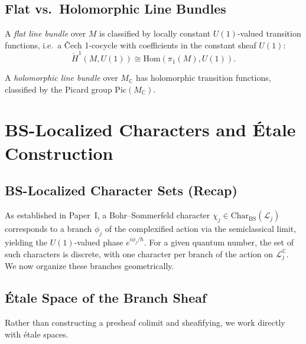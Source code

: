 \documentclass[11pt]{article}
\begin{document}
\subsection{Flat vs.\ Holomorphic Line Bundles}

A \emph{flat line bundle} over $M$ is classified by locally constant
$U(1)$-valued transition functions, i.e.\ a \v{C}ech 1-cocycle with
coefficients in the constant sheaf $U(1)$:
\[
  \check{H}^1(M, U(1)) \cong \mathrm{Hom}(\pi_1(M), U(1)).
\]

A \emph{holomorphic line bundle} over $M_\mathbb{C}$ has holomorphic
transition functions, classified by the Picard group
$\mathrm{Pic}(M_\mathbb{C})$.

\section{BS-Localized Characters and Étale Construction}
\label{sec:setup}

\subsection{BS-Localized Character Sets (Recap)}

As established in Paper~I, a Bohr--Sommerfeld character $\chi_j \in \mathrm{Char}_{\mathrm{BS}}(\mathcal{L}_j)$ corresponds to a branch $\phi_j$ of the complexified action via the semiclassical limit, yielding the $U(1)$-valued phase $e^{i\phi_j/\hbar}$. For a given quantum number, the set of such characters is discrete, with one character per branch of the action on $\mathcal{L}_j^\mathbb{C}$. We now organize these branches geometrically.

\subsection{Étale Space of the Branch Sheaf}

Rather than constructing a presheaf colimit and sheafifying, we work
directly with étale spaces.
\end{document}
